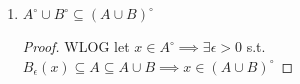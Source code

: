 \begin{enumerate}
\begin{proof}
\begin{enumerate}[i.]
      \item $\forall x\in A^\circ \cap B^\circ \Rightarrow x\in A^\circ, B^\circ \implies \exists\epsilon>0, \epsilon'>0 \text{ s.t. } B_{\epsilon}(x)\subseteq A \land$ WLOG let $ \epsilon' > \epsilon \implies B_{\epsilon}(x)\subseteq B_{\epsilon'}(x)\subseteq B\implies B_{\epsilon}(x)\subseteq A\cap B\implies x\in (A\cap B)^\circ$
    \end{enumerate}
  \end{proof}

  \item $A^\circ \cup B^\circ \subseteq (A\cup B)^\circ$

  \begin{proof}
    WLOG let $x\in A^\circ\implies \exists \epsilon > 0$ s.t. $B_\epsilon(x)\subseteq A \subseteq A\cup B\implies x\in (A \cup B)^\circ$ 
  \end{proof}
\end{enumerate}
